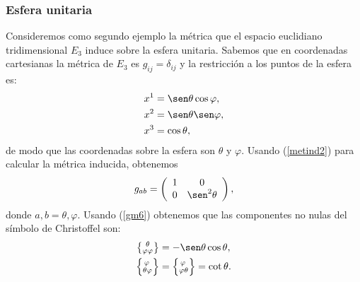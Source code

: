 \subsubsection{Esfera unitaria}

Consideremos como segundo ejemplo la métrica que el espacio euclidiano
tridimensional $E_{3}$ induce sobre la esfera unitaria. Sabemos que en
coordenadas cartesianas la métrica de $E_{3}$ es $g_{ij}=\delta_{ij}$ y la restricción a los puntos de la esfera es:
\begin{align}
x^1  &  =\sen\theta\cos\varphi,\\
x^2  &  =\sen\theta\sen\varphi,\\
x^{3}  &  =\cos\theta,
\end{align}
de modo que las coordenadas sobre la esfera son $\theta$ y $\varphi$. Usando
(\ref{metind2}) para calcular la métrica inducida, obtenemos
\begin{equation}
g_{ab}=\left(
\begin{array}[c]{cc}
1 & 0\\
0 & \sen^2\theta
\end{array}\right) ,  \label{ind7}
\end{equation}
donde $a,b=\theta,\varphi$. Usando (\ref{gm6}) obtenemos que las componentes no
nulas del símbolo de Christoffel son:
\begin{align}
\left\{  _{\varphi\varphi}^{\ \theta}\right\}  &  =-\sen\theta\cos\theta,\label{ind8}\\
\left\{  _{\theta\varphi}^{\, \varphi}\right\}   &  =\left\{  _{\varphi\theta}^{\,\varphi}\right\}  =\cot\theta.
\end{align}

